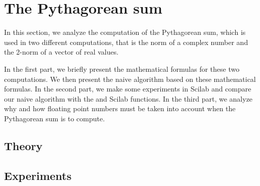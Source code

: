%

\section{The Pythagorean sum}

In this section, we analyze the computation of the Pythagorean sum,
which is used in two different computations, that is the norm of a complex
number and the 2-norm of a vector of real values.

In the first part, we briefly present the mathematical formulas for these 
two computations.
We then present the naive algorithm based on these mathematical formulas. 
In the second part, we make some experiments in Scilab and compare our
naive algorithm with the  and  Scilab functions.
In the third part, we analyze 
why and how floating point numbers must be taken into account when the 
Pythagorean sum is to compute.

\subsection{Theory}

\subsection{Experiments}


